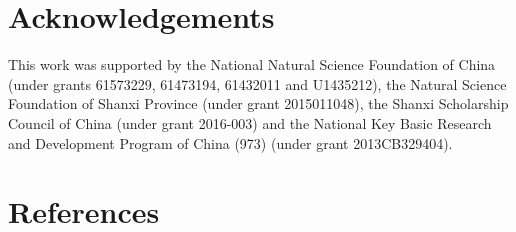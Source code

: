 \documentclass[review]{elsarticle}
\begin{document}
\section*{Acknowledgements}
This work was supported by the National Natural Science Foundation of China (under grants 61573229, 61473194, 61432011 and U1435212), the Natural Science Foundation of Shanxi Province (under grant 2015011048), the Shanxi Scholarship Council of China (under grant 2016-003) and the National Key Basic Research and Development Program of China (973) (under grant 2013CB329404).

\section*{References}


\end{document}
